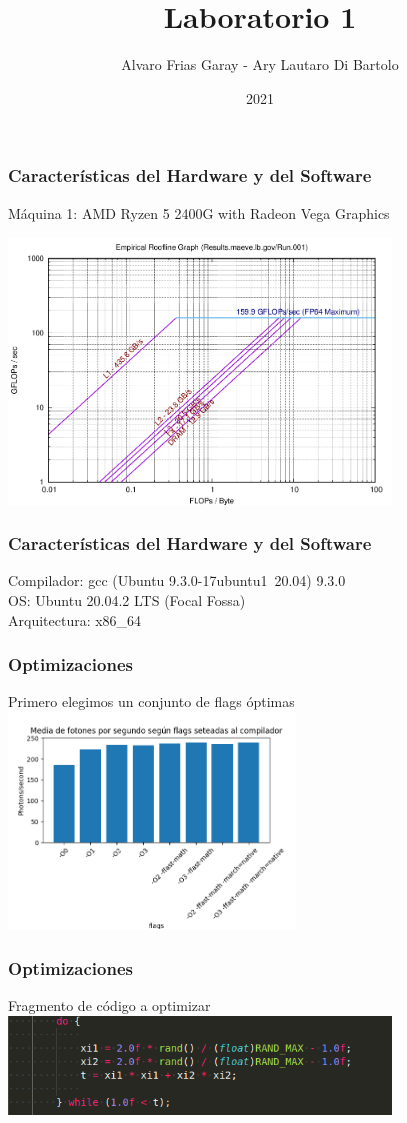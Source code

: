 \documentclass{beamer}
\title{Laboratorio 1}
\author{Alvaro Frias Garay - Ary Lautaro Di Bartolo}
\institute{Universidad Nacional de Córdoba - Universidad de Lautaro}
\date{2021}
\begin{document}
\frame{\titlepage}


\begin{frame}
    \frametitle{Características del Hardware y del Software}
    Máquina 1: AMD Ryzen 5 2400G with Radeon Vega Graphics

    \includegraphics[width=4in]{./imagenes/RTK_ALVARO.png}


\end{frame}

\begin{frame}
    \frametitle{Características del Hardware y del Software}
    Compilador: gcc (Ubuntu 9.3.0-17ubuntu1~20.04) 9.3.0 \\
    OS: Ubuntu 20.04.2 LTS (Focal Fossa) \\
    Arquitectura: x86\_64
\end{frame}


\begin{frame}
    \frametitle{Optimizaciones}

    Primero elegimos un conjunto de flags óptimas \pause
    \includegraphics[width=3in]{./imagenes/comparacion_flags_sin_optimizar.png}

\end{frame}

\begin{frame}
    \frametitle{Optimizaciones}

    Fragmento de código a optimizar \\
    \includegraphics[width=4in]{./imagenes/dowhile_optimizar.png}

\end{frame}
\end{document}
